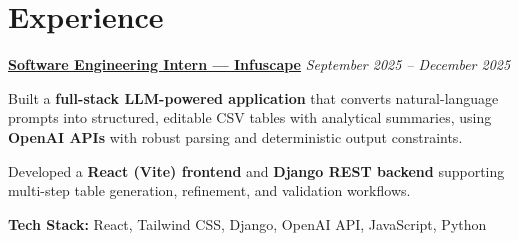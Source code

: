 \section{Experience}
\begin{onecolentry}
\textbf{\underline{Software Engineering Intern — Infuscape}} \hfill \textit{September 2025 -- December 2025}
\end{onecolentry}
\begin{onecolentry}
\begin{highlights}
    \item Built a \textbf{full-stack LLM-powered application} that converts natural-language prompts into structured, editable CSV tables with analytical summaries, using \textbf{OpenAI APIs} with robust parsing and deterministic output constraints.
    \item Developed a \textbf{React (Vite) frontend} and \textbf{Django REST backend} supporting multi-step table generation, refinement, and validation workflows.
    \item \textbf{Tech Stack:} React, Tailwind CSS, Django, OpenAI API, JavaScript, Python
\end{highlights}
\end{onecolentry}